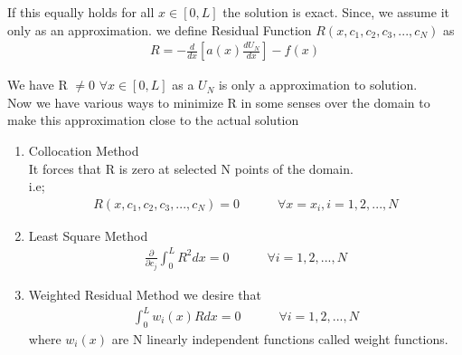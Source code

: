 If this equally holds for all $x \in [0,L] $ the solution is exact. Since, we assume it only as an approximation.
we define Residual Function $R(x,c_1, c_2, c_3,...,c_N)$ as
\begin{eqnarray}
	R = -\frac{d}{dx} \left[a(x)\frac{dU_N}{dx} \right] - f(x)
\end{eqnarray} 

We have R $\neq$0 $ \forall x  \in [0, L]$  as a $U_N$ is only a approximation to solution.\\

Now we have various ways to minimize R in some senses over the domain to make this approximation close to the actual solution\\
\begin{enumerate}
	\item Collocation Method\\
	It forces that R is zero at selected N points of the domain.\\
	i.e; 
	\begin{eqnarray}
		R(x,c_1, c_2, c_3,...,c_N) = 0  \quad\quad\quad \forall x=x_i, i = 1,2,...,N
	\end{eqnarray}

	\item Least Square Method
		\begin{eqnarray}
			\frac{\partial}{\partial c_j} \int_{0}^{L} R^2 dx = 0 \quad\quad\quad \forall i = 1,2,...,N
		\end{eqnarray}
	
	\item Weighted Residual Method
		we desire that 
			\begin{eqnarray}
				\int_{0}^{L} w_i(x) R dx = 0 \quad\quad\quad \forall i = 1,2,...,N
			\end{eqnarray}
		where $w_i(x)$ are N linearly independent functions called weight functions.
\end{enumerate}

